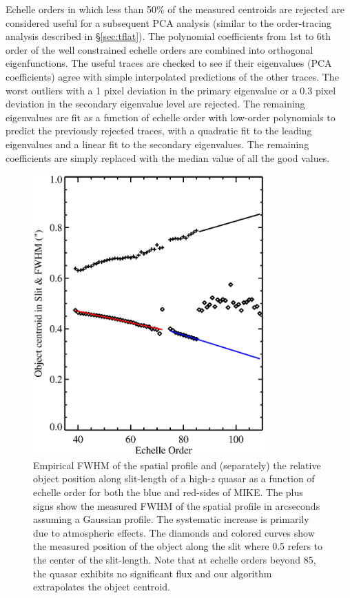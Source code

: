 \documentclass[]{emulateapj}
\begin{document}
Echelle orders in which less than 50\% of the measured centroids 
are rejected are considered useful for a subsequent PCA analysis (similar
to the order-tracing analysis described in  \S\ref{sec:tflat}). 
The polynomial coefficients from 1st to 6th order of the well
constrained echelle orders are combined into orthogonal eigenfunctions.
The useful traces are checked to see if their eigenvalues 
(PCA coefficients) agree with simple interpolated predictions of the 
other traces.  The worst outliers with a 1 pixel deviation in the primary 
eigenvalue or a 0.3 pixel deviation in the secondary eigenvalue level are 
rejected.  The remaining eigenvalues are fit as a function of 
echelle order with low-order polynomials to
predict the previously rejected traces, with a quadratic fit to the leading
eigenvalues and a linear fit to the secondary eigenvalues.  The remaining
coefficients are simply replaced with the median value of all the good 
values.   


\begin{figure}
\includegraphics[width=3.5in]{f11.eps}
\caption{Empirical FWHM of the spatial profile and (separately)
the relative object position along slit-length of a high-$z$ quasar
as a function of echelle order for both the blue and red-sides of MIKE. 
The plus signs show the measured FWHM of the spatial profile in arcseconds
assuming a Gaussian profile.  The systematic increase is primarily
due to atmospheric effects.  The diamonds and colored curves
show the measured position of the object along the slit where 0.5
refers to the center of the slit-length.  Note that at echelle orders
beyond 85, the quasar exhibits no significant flux and our algorithm
extrapolates the object centroid. 
}
\label{fig:fwhm}
\end{figure}
\end{document}
